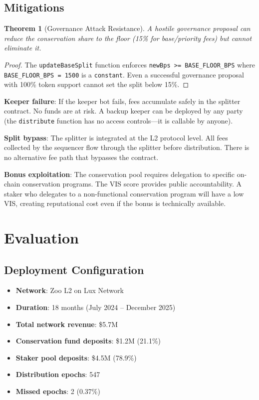 \documentclass[11pt,letterpaper]{article}
\newtheorem{theorem}{Theorem}[section]
\begin{document}
\subsection{Mitigations}

\begin{theorem}[Governance Attack Resistance]
A hostile governance proposal can reduce the conservation share to the floor (15\% for base/priority fees) but cannot eliminate it.
\end{theorem}

\begin{proof}
The \texttt{updateBaseSplit} function enforces \texttt{newBps >= BASE\_FLOOR\_BPS} where \texttt{BASE\_FLOOR\_BPS = 1500} is a \texttt{constant}. Even a successful governance proposal with 100\% token support cannot set the split below 15\%.
\end{proof}

\textbf{Keeper failure}: If the keeper bot fails, fees accumulate safely in the splitter contract. No funds are at risk. A backup keeper can be deployed by any party (the \texttt{distribute} function has no access controls---it is callable by anyone).

\textbf{Split bypass}: The splitter is integrated at the L2 protocol level. All fees collected by the sequencer flow through the splitter before distribution. There is no alternative fee path that bypasses the contract.

\textbf{Bonus exploitation}: The conservation pool requires delegation to specific on-chain conservation programs. The VIS score provides public accountability. A staker who delegates to a non-functional conservation program will have a low VIS, creating reputational cost even if the bonus is technically available.

\section{Evaluation}
\label{sec:evaluation}

\subsection{Deployment Configuration}

\begin{itemize}
    \item \textbf{Network}: Zoo L2 on Lux Network
    \item \textbf{Duration}: 18 months (July 2024 -- December 2025)
    \item \textbf{Total network revenue}: \$5.7M
    \item \textbf{Conservation fund deposits}: \$1.2M (21.1\%)
    \item \textbf{Staker pool deposits}: \$4.5M (78.9\%)
    \item \textbf{Distribution epochs}: 547
    \item \textbf{Missed epochs}: 2 (0.37\%)
\end{itemize}
\end{document}
